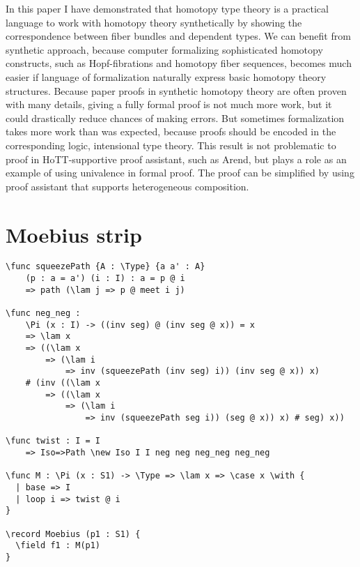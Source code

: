 \Conc

In this paper I have demonstrated that homotopy type theory is a practical language to work with homotopy theory synthetically by showing the correspondence between fiber bundles and dependent types. We can benefit from synthetic approach, because computer formalizing sophisticated homotopy constructs, such as Hopf-fibrations and homotopy fiber sequences, becomes much easier if language of formalization naturally express basic homotopy theory structures. Because paper proofs in synthetic homotopy theory are often proven with many details, giving a fully formal proof is not much more work, but it could drastically reduce chances of making errors. But sometimes formalization takes more work than was expected, because proofs should be encoded in the corresponding logic, intensional type theory. \autocite{Doorn1}
This result is not problematic to proof in HoTT-supportive proof assistant, such as Arend, but plays a role as an example of using univalence in formal proof. The proof can be simplified by using proof assistant that supports heterogeneous composition.

\printbibliography[%
    heading=bibintoc%
    ,title=Bibliography
]

\appendix
{}

\section{Moebius strip}

\begin{ListingEnv}[H]
\begin{lstlisting}
\func squeezePath {A : \Type} {a a' : A} 
	(p : a = a') (i : I) : a = p @ i 
	=> path (\lam j => p @ meet i j)

\func neg_neg : 
	\Pi (x : I) -> ((inv seg) @ (inv seg @ x)) = x 
	=> \lam x 
	=> ((\lam x 
    	=> (\lam i 
    		=> inv (squeezePath (inv seg) i)) (inv seg @ x)) x)
    # (inv ((\lam x 
    	=> ((\lam x 
    		=> (\lam i 
    			=> inv (squeezePath seg i)) (seg @ x)) x) # seg) x))

\func twist : I = I 
	=> Iso=>Path \new Iso I I neg neg neg_neg neg_neg

\func M : \Pi (x : S1) -> \Type => \lam x => \case x \with {
  | base => I
  | loop i => twist @ i
}

\record Moebius (p1 : S1) {
  \field f1 : M(p1)
}
\end{lstlisting}
\end{ListingEnv}


